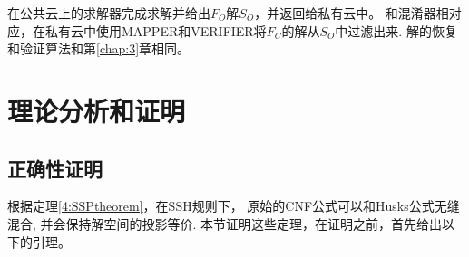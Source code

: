 在公共云上的求解器完成求解并给出$F_O$解$S_O$，并返回给私有云中。
和混淆器相对应，在私有云中使用MAPPER和VERIFIER将$F_C$的解从$S_O$中过滤出来.
解的恢复和验证算法和第\ref{chap:3}章相同。
%
%

\section{理论分析和证明}
\subsection{正确性证明}\label{4:correctness}

根据定理\ref{4:SSPtheorem}，在SSH规则下，
原始的CNF公式可以和Husks公式无缝混合, 并会保持解空间的投影等价.
本节证明这些定理，在证明之前，首先给出以下的引理。

